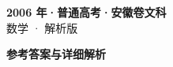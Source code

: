 \documentclass[zihao=-4, a4paper]{ctexart}
\begin{document}
\begin{center}
  {\Large\bfseries 2006 年·普通高考·安徽卷文科}\\[4pt]
  {\large 数学 · 解析版}
\end{center}
\medskip
{}

\clearpage
{}
\begin{center}{\Large\bfseries 参考答案与详细解析}\end{center}
\medskip

\end{document}
